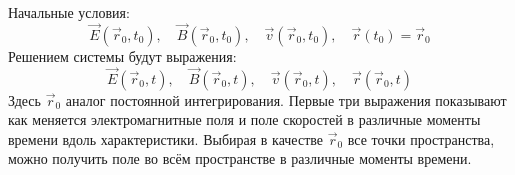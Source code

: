 Начальные условия:
\[
	\vec{E}(\vec{r}_0, t_0), \quad \vec{B}(\vec{r}_0, t_0),  \quad\vec{v}(\vec{r}_0, t_0), \quad \vec{r}(t_0) = \vec{r}_0
\]
Решением системы будут выражения:
\[
	\vec{E}(\vec{r}_0, t), \quad \vec{B}(\vec{r}_0, t),  \quad\vec{v}(\vec{r}_0, t), \quad \vec{r}(\vec{r}_0, t)
\]
Здесь $\vec{r}_0$ аналог постоянной интегрирования. Первые три выражения показывают как меняется электромагнитные поля и поле скоростей в различные моменты времени вдоль характеристики. Выбирая в качестве $\vec{r}_0$ все точки пространства, можно получить поле во всём пространстве в различные моменты времени.